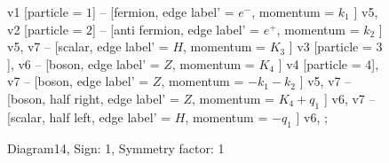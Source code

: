 \documentclass{revtex4}
\begin{document}
\begin{figure}[!htb]
\begin{center}
{    %
v1 [particle = \(1\)] -- [fermion, edge label' = \(e^{-}\), momentum = \(k_{1}\) ] v5, 
v2 [particle = \(2\)] -- [anti fermion, edge label' = \(e^{+}\), momentum = \(k_{2}\) ] v5, 
v7 -- [scalar, edge label' = \(H\), momentum = \(K_{3}\) ] v3 [particle = \(3\)], 
v6 -- [boson, edge label' = \(Z\), momentum = \(K_{4}\) ] v4 [particle = \(4\)], 
v7 -- [boson, edge label' = \(Z\), momentum = \(-k_{1} - k_{2}\) ] v5, 
v7 -- [boson, half right, edge label' = \(Z\), momentum = \(K_{4} + q_{1}\) ] v6, 
v7 -- [scalar, half left, edge label' = \(H\), momentum = \(-q_{1}\) ] v6, 
};
\end{center}
\caption{Diagram14, Sign: 1, Symmetry factor: 1}
\end{figure}
\newpage
\end{document}
